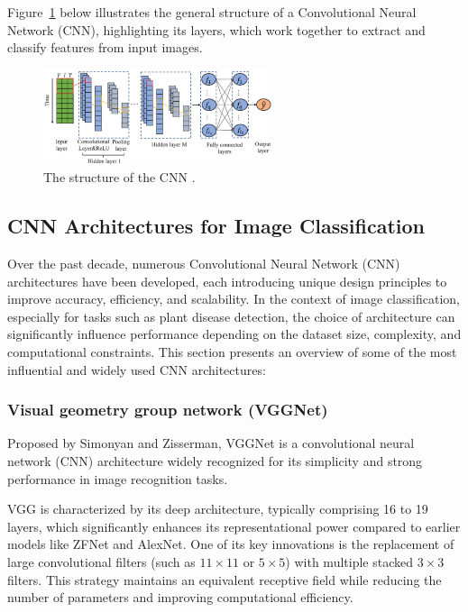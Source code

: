 Figure~\ref{fig:figure07} below illustrates the general structure of a Convolutional Neural Network (CNN), highlighting its layers, which work together to extract and classify features from input images.

\begin{figure}[H] %
    \centering
    \includegraphics[width=0.6\textwidth]{chapters/chapter1/images/Figure07.png}
    \caption{The structure of the CNN \parencite{crocioni2020li}.}
    \label{fig:figure07}
\end{figure}


\subsection{CNN Architectures for Image Classification}
Over the past decade, numerous Convolutional Neural Network (CNN) architectures have been developed, each introducing unique design principles to improve accuracy, efficiency, and scalability. In the context of image classification, especially for tasks such as plant disease detection, the choice of architecture can significantly influence performance depending on the dataset size, complexity, and computational constraints.
This section presents an overview of some of the most influential and widely used CNN architectures:
\subsubsection{Visual geometry group network (VGGNet)}
Proposed by Simonyan and Zisserman, VGGNet is a convolutional neural network (CNN) architecture widely recognized for its simplicity and strong performance in image recognition tasks.

VGG is characterized by its deep architecture, typically comprising 16 to 19 layers, which significantly enhances its representational power compared to earlier models like ZFNet and AlexNet. One of its key innovations is the replacement of large convolutional filters (such as $11 \times 11$ or $5 \times 5$) with multiple stacked $3 \times 3$ filters. This strategy maintains an equivalent receptive field while reducing the number of parameters and improving computational efficiency.

